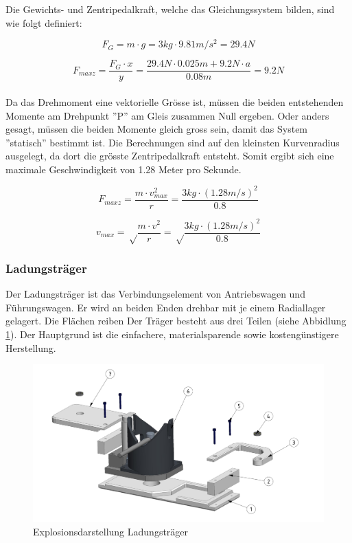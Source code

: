 \documentclass[../../main.tex]{subfiles}
\begin{document}
    Die Gewichts- und Zentripedalkraft, welche das Gleichungssystem bilden, sind wie folgt definiert:

    $$F_{G}=m \cdot g=3kg \cdot 9.81m/s^2=29.4N$$

    $$F_{max z}=\frac{F_{G} \cdot x}{y}=\frac{29.4N \cdot 0.025m+9.2N \cdot a}{0.08m}=9.2N$$
    \\
    Da das Drehmoment eine vektorielle Grösse ist, müssen die beiden entstehenden Momente am Drehpunkt ''P'' am Gleis zusammen Null ergeben. Oder anders gesagt, müssen die beiden Momente gleich gross sein, damit das System ''statisch'' bestimmt ist. Die Berechnungen sind auf den kleinsten Kurvenradius ausgelegt, da dort die grösste Zentripedalkraft entsteht. Somit ergibt sich eine maximale Geschwindigkeit von 1.28 Meter pro Sekunde.

    $$F_{max z}=\frac{m \cdot v_{max}^2}{r}=\frac{3kg \cdot (1.28m/s)^2}{0.8}$$

    $$v_{max}=\sqrt\frac{m \cdot v^2}{r}=\sqrt\frac{3kg \cdot (1.28m/s)^2}{0.8}$$

        \pagebreak
    \subsubsection{Ladungsträger}
    Der Ladungsträger ist das Verbindungselement von Antriebswagen und Führungswagen. Er wird an beiden Enden drehbar mit je einem Radiallager gelagert. Die Flächen reiben Der Träger besteht aus drei Teilen (siehe Abbidlung \ref{fig:expl_ladungstraeger}). Der Hauptgrund ist die einfachere, materialsparende sowie kostengünstigere Herstellung.\\

    \begin{figure}[H] %
        \centering
        \includegraphics[width=1\textwidth]{ladungstraeger.png}
        \caption{Explosionsdarstellung Ladungsträger}
        \label{fig:expl_ladungstraeger}
    \end{figure}
\end{document}
